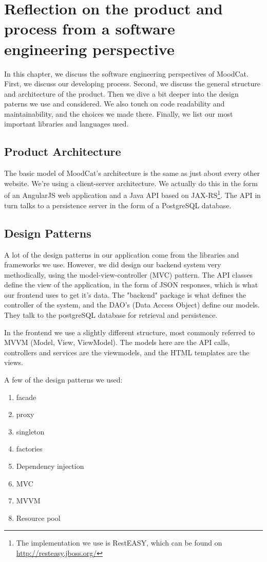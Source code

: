 \chapter{Reflection on the product and process from a software engineering perspective}
In this chapter, we discuss the software engineering perspectives of MoodCat. First, we discuss our developing process. Second, we discuss the general structure and architecture of the product. Then we dive a bit deeper into the design paterns we use and considered. We also touch on code readability and maintainability, and the choices we made there. Finally, we list our most important libraries and languages used.

\section{Product Architecture}
The basic model of MoodCat's architecture is the same as just about every other website.
We're using a client-server architecture.
We actually do this in the form of an AngularJS web application and a Java API based on JAX-RS\footnote{The implementation we use is RestEASY, which can be found on \url{http://resteasy.jboss.org/}}. 
The API in turn talks to a persistence server in the form of a PostgreSQL database.

\section{Design Patterns}
A lot of the design patterns in our application come from the libraries and frameworks we use. However, we did design our backend system very methodically, using the model-view-controller (MVC) pattern. The API classes define the view of the application, in the form of JSON responses, which is what our frontend uses to get it's data. The "backend" package is what defines the controller of the system, and the DAO's (Data Access Object) define our models. They talk to the postgreSQL database for retrieval and persistence.

In the frontend we use a slightly different structure, most commonly referred to MVVM (Model, View, ViewModel). The models here are the API calls, controllers and services are the viewmodels, and the HTML templates are the views.

A few of the design patterns we used:
\begin{enumerate}
\item facade
\item proxy
\item singleton
\item factories
\item Dependency injection
\item MVC
\item MVVM
\item Resource pool
\end{enumerate}

